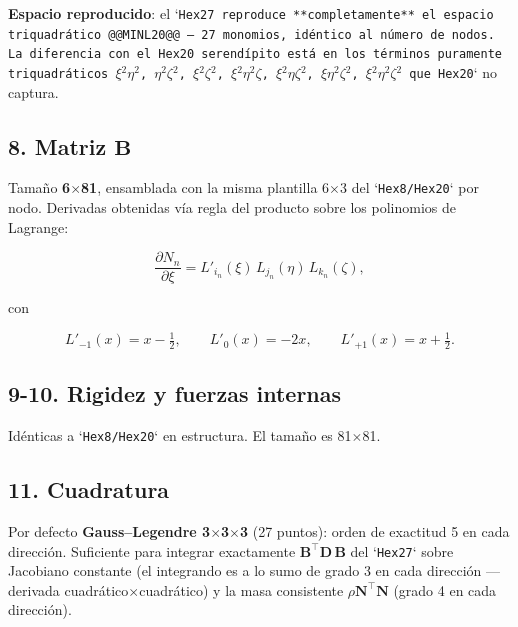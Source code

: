 \documentclass[11pt,letterpaper,oneside]{report}
\begin{document}
\textbf{Espacio reproducido}: el `\texttt{Hex27}\texttt{ reproduce **completamente** el espacio triquadrático @@MINL20@@ --- 27 monomios, idéntico al número de nodos. La diferencia con el }\texttt{Hex20}\texttt{ serendípito está en los términos puramente triquadráticos }\texttt{\ensuremath{\xi}\ensuremath{^{2}}\ensuremath{\eta}\ensuremath{^{2}}}\texttt{, }\texttt{\ensuremath{\eta}\ensuremath{^{2}}\ensuremath{\zeta}\ensuremath{^{2}}}\texttt{, }\texttt{\ensuremath{\xi}\ensuremath{^{2}}\ensuremath{\zeta}\ensuremath{^{2}}}\texttt{, }\texttt{\ensuremath{\xi}\ensuremath{^{2}}\ensuremath{\eta}\ensuremath{^{2}}\ensuremath{\zeta}}\texttt{, }\texttt{\ensuremath{\xi}\ensuremath{^{2}}\ensuremath{\eta}\ensuremath{\zeta}\ensuremath{^{2}}}\texttt{, }\texttt{\ensuremath{\xi}\ensuremath{\eta}\ensuremath{^{2}}\ensuremath{\zeta}\ensuremath{^{2}}}\texttt{, }\texttt{\ensuremath{\xi}\ensuremath{^{2}}\ensuremath{\eta}\ensuremath{^{2}}\ensuremath{\zeta}\ensuremath{^{2}}}\texttt{ que }\texttt{Hex20}` no captura.

\subsection{8. Matriz $\mathbf B$}

Tamaño \textbf{6\ensuremath{\times}81}, ensamblada con la misma plantilla 6\ensuremath{\times}3 del `\texttt{Hex8}\texttt{/}\texttt{Hex20}` por nodo. Derivadas obtenidas vía regla del producto sobre los polinomios de Lagrange:

\[
\frac{\partial N_n}{\partial \xi} = L'_{i_n}(\xi)\,L_{j_n}(\eta)\,L_{k_n}(\zeta),
\]

con

\[
L'_{-1}(x) = x - \tfrac{1}{2},\qquad L'_0(x) = -2x,\qquad L'_{+1}(x) = x + \tfrac{1}{2}.
\]

\subsection{9-10. Rigidez y fuerzas internas}

Idénticas a `\texttt{Hex8}\texttt{/}\texttt{Hex20}` en estructura. El tamaño es 81\ensuremath{\times}81.

\subsection{11. Cuadratura}

Por defecto \textbf{Gauss--Legendre 3\ensuremath{\times}3\ensuremath{\times}3} (27 puntos): orden de exactitud 5 en cada dirección. Suficiente para integrar exactamente $\mathbf B^\top \mathbf D\, \mathbf B$ del `\texttt{Hex27}` sobre Jacobiano constante (el integrando es a lo sumo de grado 3 en cada dirección --- derivada cuadrático\ensuremath{\times}cuadrático) y la masa consistente $\rho \mathbf N^\top \mathbf N$ (grado 4 en cada dirección).
\end{document}
